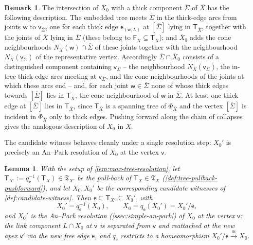 \documentclass[reqno]{amsart}
\newtheorem{lemma}[theorem]{Lemma}
\theoremstyle{definition}
\newtheorem{remark}[theorem]{Remark}
\newcommand\sfT{\mathsf{T}}
\newcommand\sfe{\mathsf{e}}
\newcommand\sfv{\mathsf{v}}
\newcommand\sfw{\mathsf{w}}
\renewcommand{\bar}{\overline}
\numberwithin{equation}{section}
\begin{document}
\begin{remark}\label{rem:X0-meets-free-component}
The intersection of \(\bar X_0\) with a thick component
\(\bar\Sigma\) of \(\bar X\) has the following description. The
embedded tree meets \(\bar\Sigma\) in the thick-edge arcs from
joints \(\sfw\) to \(\sfv_{\bar\Sigma}\), one for each thick edge
\(\sfe_{(\sfw,L)}\) at \([\bar\Sigma]\) lying in \(\sfT_{\bar X}\),
together with the joints of \(\bar X\) lying in \(\bar\Sigma\)
(these belong to \(\mathsf{F}_{\bar X}\subseteq \sfT_{\bar X}\));
and \(\bar X_0\) adds the cone neighbourhoods
\(N_{\bar X}(\sfw)\cap\bar\Sigma\) of these joints together with
the neighbourhood \(N_{\bar X}(\sfv_{\bar\Sigma})\) of the
representative vertex. Accordingly \(\bar\Sigma\cap\bar X_0\)
consists of a distinguished component containing
\(\sfv_{\bar\Sigma}\) -- the neighbourhood
\(N_{\bar X}(\sfv_{\bar\Sigma})\), the in-tree thick-edge arcs
meeting at \(\sfv_{\bar\Sigma}\), and the cone neighbourhoods of
the joints at which these arcs end -- and, for each joint
\(\sfw\in\bar\Sigma\) none of whose thick edges towards
\([\bar\Sigma]\) lies in \(\sfT_{\bar X}\), the cone neighbourhood
of \(\sfw\) in \(\bar\Sigma\). At least one thick edge at
\([\bar\Sigma]\) lies in \(\sfT_{\bar X}\), since \(\sfT_{\bar X}\) is
a spanning tree of \(\Phi_{\bar X}\) and the vertex
\([\bar\Sigma]\) is incident in \(\Phi_{\bar X}\) only to thick
edges. Pushing forward along the chain of collapses gives the
analogous description of \(X_0\) in \(X\).
\end{remark}

The candidate witness behaves cleanly under a single resolution
step: \(X_0'\) is precisely an An--Park resolution of \(X_0\) at the
vertex \(\sfv\).

\begin{lemma}\label{lem:witness-resolution}
With the setup of \cref{lem:max-tree-resolution}, let
\(\sfT_{X'}:=q_\sfe^{-1}(\sfT_X)\in\mathfrak{T}_{X'}\) be the pull-back of
\(\sfT_X\in\mathfrak{T}_X\)
(\cref{def:tree-pullback-pushforward}), and let
\(X_0,X_0'\) be the corresponding candidate witnesses of
\cref{def:candidate-witness}. Then
\(\sfe\subseteq \sfT_{X'}\subseteq X_0'\), with
\[
X_0' = q_\sfe^{-1}(X_0),
\qquad
X_0 = q_\sfe(X_0') = X_0'/\sfe,
\]
and \(X_0'\) is the An--Park resolution
(\cref{ssec:simple-an-park}) of \(X_0\) at the vertex \(\sfv\):
the link component \(L\cap X_0\) at \(\sfv\) is separated from \(\sfv\) and
reattached at the new apex \(\sfv'\) via the new free edge \(\sfe\), and
\(q_\sfe\) restricts to a homeomorphism
\(X_0'/\sfe\xrightarrow{\cong}X_0\).
\end{lemma}
\end{document}
